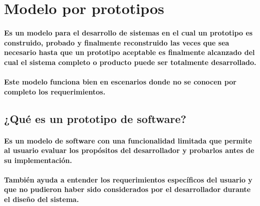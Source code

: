 \section{Modelo por prototipos}
  \paragraph{Es un modelo para el desarrollo de sistemas en el cual un prototipo es construido, probado y finalmente reconstruido las veces que sea necesario hasta que un prototipo aceptable es finalmente alcanzado del cual el sistema completo o producto puede ser totalmente desarrollado.}

  \paragraph{Este modelo funciona bien en escenarios donde no se conocen por completo los requerimientos.}

\subsection{¿Qué es un prototipo de software?}
  \paragraph{Es un modelo de software con una funcionalidad limitada que permite al usuario evaluar los propósitos del desarrollador y probarlos antes de su implementación.}
  \paragraph{También ayuda a entender los requerimientos específicos del usuario y que no pudieron haber sido considerados por el desarrollador durante el diseño del sistema.}

